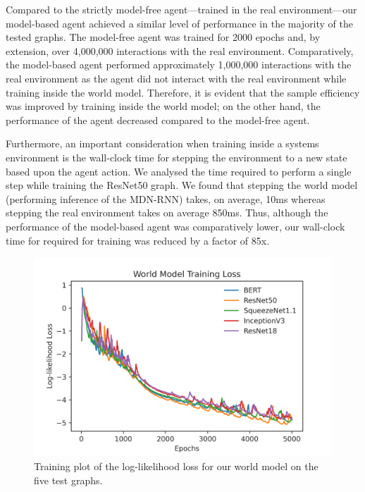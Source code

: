 Compared to the strictly model-free agent---trained in the real environment---our model-based agent achieved a similar level of performance in the majority of the tested graphs. The model-free agent was trained for 2000 epochs and, by extension, over 4,000,000 interactions with the real environment. Comparatively, the model-based agent performed approximately 1,000,000 interactions with the real environment as the agent did not interact with the real environment while training inside the world model. Therefore, it is evident that the sample efficiency was improved by training inside the world model; on the other hand, the performance of the agent decreased compared to the model-free agent.

Furthermore, an important consideration when training inside a systems environment is the wall-clock time for stepping the environment to a new state based upon the agent action. We analysed the time required to perform a single step while training the ResNet50 graph. We found that stepping the world model (performing inference of the MDN-RNN) takes, on average, 10ms whereas stepping the real environment takes on average 850ms. Thus, although the performance of the model-based agent was comparatively lower, our wall-clock time for required for training was reduced by a factor of 85x.

\begin{figure}[ht]
  \centering
  \includegraphics[width=1\columnwidth]{sections/5evaluation/images/mb_training_loss.png}
  \caption[Log-likelihood loss of world models]{Training plot of the log-likelihood loss for our world model on the five test graphs.}
  \label{fig:eval:world-model-loss}
\end{figure}

